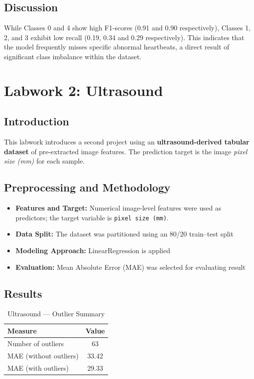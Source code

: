 \documentclass[conference]{IEEEtran}
\begin{document}
\subsection{Discussion}

While Classes 0 and 4 show high F1-scores (0.91 and 0.90 respectively), Classes 1, 2, and 3 exhibit low recall (0.19, 0.34 and 0.29 respectively). This indicates that the model frequently misses specific abnormal heartbeats, a direct result of significant class imbalance within the dataset.


\section{Labwork 2: Ultrasound}

\subsection{Introduction}

This labwork introduces a second project using an \textbf{ultrasound-derived tabular dataset} of pre-extracted image features. The prediction target is the image \emph{pixel size (mm)} for each sample.

\subsection{Preprocessing and Methodology}

\begin{itemize}
    \item \textbf{Features and Target:} Numerical image-level features were used as predictors; the target variable is \texttt{pixel size (mm)}.
    \item \textbf{Data Split:} The dataset was partitioned using an 80/20 train--test split
    \item \textbf{Modeling Approach:} LinearRegression is applied
    \item \textbf{Evaluation:} Mean Absolute Error (MAE) was selected for evaluating result
\end{itemize}

\subsection{Results}

\begin{table}[h]
\centering
\caption{Ultrasound — Outlier Summary}
\begin{tabular}{lc}
\toprule
\textbf{Measure} & \textbf{Value} \\ \midrule
Number of outliers & 63 \\
MAE (without outliers) & 33.42 \\
MAE (with outliers) & 29.33 \\ \bottomrule
\end{tabular}
\end{table}
\end{document}
